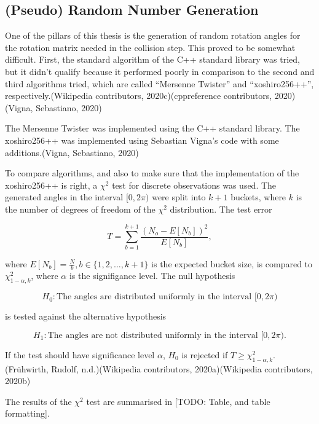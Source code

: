 \documentclass[
]{article}
\begin{document}
\hypertarget{pseudo-random-number-generation}{%
\subsection{(Pseudo) Random Number
Generation}\label{pseudo-random-number-generation}}

One of the pillars of this thesis is the generation of random rotation
angles for the rotation matrix needed in the collision step. This proved
to be somewhat difficult. First, the standard algorithm of the C++
standard library was tried, but it didn't qualify because it performed
poorly in comparison to the second and third algorithms tried, which are
called ``Mersenne Twister'' and ``xoshiro256++'',
respectively.(Wikipedia contributors, 2020c)(cppreference contributors,
2020)(Vigna, Sebastiano, 2020)

The Mersenne Twister was implemented using the C++ standard library. The
xoshiro256++ was implemented using Sebastian Vigna's code with some
additions.(Vigna, Sebastiano, 2020)

To compare algorithms, and also to make sure that the implementation of
the xoshiro256++ is right, a \(\chi^2\) test for discrete observations
was used. The generated angles in the interval \([0, 2\pi)\) were split
into \(k+1\) buckets, where \(k\) is the number of degrees of freedom of
the \(\chi^2\) distribution. The test error

\begin{equation}
T = \sum_{b=1}^{k+1}{\frac{(N_o - E[N_b])^2}{E[N_b]}},
\end{equation}

where \(E[N_b] = \frac{N}{b}, b \in \{1, 2, \dots , k+1\}\) is the
expected bucket size, is compared to \(\chi^2_{1-\alpha, k}\), where
\(\alpha\) is the signifigance level. The null hypothesis

\[
H_0: \textrm{The angles are distributed uniformly in the interval } [0, 2 \pi)
\]

is tested against the alternative hypothesis

\[
H_1: \textrm{The angles are not distributed uniformly in the interval } [0, 2 \pi) \textrm{.}
\]

If the test should have significance level \(\alpha\), \(H_0\) is
rejected if \(T \ge \chi^2_{1-\alpha, k}\).(Frühwirth, Rudolf,
n.d.)(Wikipedia contributors, 2020a)(Wikipedia contributors, 2020b)

The results of the \(\chi^2\) test are summarised in {[}TODO: Table, and
table formatting{]}.
\end{document}
